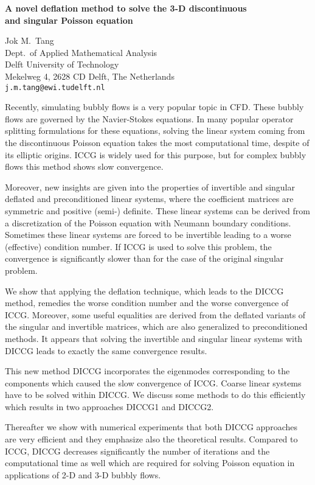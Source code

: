 \documentclass{report}
\begin{document}

\begin{center}
{\large
{\bf A novel deflation method to solve the 3-D discontinuous \\
	and singular Poisson equation}}

	Jok M.~Tang \\
	Dept.~of Applied Mathematical Analysis \\
	Delft University of Technology \\
	Mekelweg 4, 2628 CD Delft, The Netherlands \\ 
	{\tt j.m.tang@ewi.tudelft.nl}
\end{center}
Recently, simulating bubbly flows is a very popular topic in
CFD. These bubbly flows are governed by the Navier-Stokes
equations. In many popular operator splitting formulations
for these equations, solving the linear system coming from
the discontinuous Poisson equation takes the most
computational time, despite of its elliptic origins. ICCG is
widely used for this purpose, but for complex bubbly flows
this method shows slow convergence.

Moreover, new insights are given into the properties of
invertible and singular deflated and preconditioned linear
systems, where the coefficient matrices are symmetric and
positive (semi-) definite. These linear systems can be
derived from a discretization of the Poisson equation with
Neumann boundary conditions. Sometimes these linear systems
are forced to be invertible leading to a worse (effective)
condition number. If ICCG is used to solve this problem, the
convergence is significantly slower than for the case of the
original singular problem.

We show that applying the deflation technique, which leads
to the DICCG method, remedies the worse condition number and
the worse convergence of ICCG. Moreover, some useful
equalities are derived from the deflated variants of the
singular and invertible matrices, which are also generalized
to preconditioned methods. It appears that solving the
invertible and singular linear systems with DICCG leads to
exactly the same convergence results.

This new method DICCG incorporates the eigenmodes
corresponding to the components which caused the slow
convergence of ICCG. Coarse linear systems have to be solved
within DICCG. We discuss some methods to do this efficiently
which results in two approaches DICCG1 and DICCG2.

Thereafter we show with numerical experiments that both DICCG
approaches are very efficient and they emphasize also the
theoretical results. Compared to ICCG, DICCG decreases
significantly the number of iterations and the computational
time as well which are required for solving Poisson equation
in applications of 2-D and 3-D bubbly flows.



\end{document}

